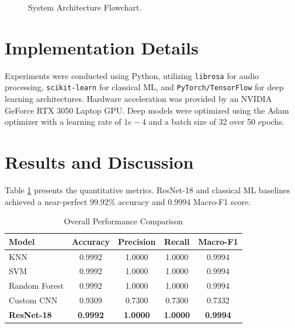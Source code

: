 \documentclass[conference]{IEEEtran}
\begin{document}
\begin{figure}[htbp]
\centering
{}
\caption{System Architecture Flowchart.}
\label{fig:flowchart}
\end{figure}

\section{Implementation Details}
Experiments were conducted using Python, utilizing \texttt{librosa} for audio processing, \texttt{scikit-learn} for classical ML, and \texttt{PyTorch/TensorFlow} for deep learning architectures. Hardware acceleration was provided by an NVIDIA GeForce RTX 3050 Laptop GPU. Deep models were optimized using the Adam optimizer with a learning rate of $1e-4$ and a batch size of 32 over 50 epochs.

\section{Results and Discussion}
Table \ref{tab:results} presents the quantitative metrics. ResNet-18 and classical ML baselines achieved a near-perfect 99.92\% accuracy and 0.9994 Macro-F1 score. 

\begin{table}[htbp]
\caption{Overall Performance Comparison}
\begin{center}
\begin{tabular}{l c c c c}
\toprule
\textbf{Model} & \textbf{Accuracy} & \textbf{Precision} & \textbf{Recall} & \textbf{Macro-F1} \\
\midrule
KNN & 0.9992 & 1.0000 & 1.0000 & 0.9994 \\
SVM & 0.9992 & 1.0000 & 1.0000 & 0.9994 \\
Random Forest & 0.9992 & 1.0000 & 1.0000 & 0.9994 \\
Custom CNN & 0.9309 & 0.7300 & 0.7300 & 0.7332 \\
\textbf{ResNet-18} & \textbf{0.9992} & \textbf{1.0000} & \textbf{1.0000} & \textbf{0.9994} \\
\bottomrule
\end{tabular}
\label{tab:results}
\end{center}
\end{table}
\end{document}
